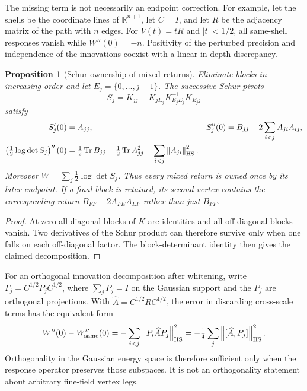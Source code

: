\documentclass[11pt,oneside,openany]{book}
\newtheorem{proposition}[proposition]{Proposition}
\theoremstyle{definition}
\theoremstyle{remark}
\newcommand{\R}{\mathbb R}
\newcommand{\Tr}{\operatorname{Tr}}
\newcommand{\norm}[1]{\left\lVert#1\right\rVert}
\begin{document}
The missing term is not necessarily an endpoint correction. For
example, let the shells be the coordinate lines of $\R^{n+1}$, let
$C=I$, and let $R$ be the adjacency matrix of the path with $n$ edges.
For $V(t)=tR$ and $|t|<1/2$, all same-shell responses vanish while
$W''(0)=-n$. Positivity of the perturbed precision and independence of
the innovations coexist with a linear-in-depth discrepancy.

\begin{proposition}[Schur ownership of mixed returns]
\label{prop:Schur-owned-response}
Eliminate blocks in increasing order and let $E_j=\{0,\ldots,j-1\}$.
The successive Schur pivots
\[
 S_j=K_{jj}-K_{jE_j}K_{E_jE_j}^{-1}K_{E_jj}
\]
satisfy
\begin{align}
 S_j'(0)&=A_{jj},&
 S_j''(0)&=B_{jj}-2\sum_{i<j}A_{ji}A_{ij},\notag\\
 \left(\tfrac12\log\det S_j\right)''(0)
 &=\tfrac12\Tr B_{jj}-\tfrac12\Tr A_{jj}^2
                         -\sum_{i<j}\norm{A_{ji}}_{\mathrm{HS}}^2.
 \label{eq:Schur-owned-response}
\end{align}
Moreover $W=\sum_j\tfrac12\log\det S_j$. Thus every mixed return is
owned once by its later endpoint. If a final block is retained, its
second vertex contains the corresponding return
$B_{FF}-2A_{FE}A_{EF}$ rather than just $B_{FF}$.
\end{proposition}
\begin{proof}
At zero all diagonal blocks of $K$ are identities and all off-diagonal
blocks vanish. Two derivatives of the Schur product can therefore
survive only when one falls on each off-diagonal factor. The
block-determinant identity then gives the claimed decomposition.
\end{proof}

For an orthogonal innovation decomposition after whitening, write
$\Gamma_j=C^{1/2}P_jC^{1/2}$, where $\sum_jP_j=I$ on the Gaussian
support and the $P_j$ are orthogonal projections. With
$\widehat A=C^{1/2}RC^{1/2}$, the error in discarding cross-scale terms
has the equivalent form
\begin{equation}
 W''(0)-W''_{\rm same}(0)
 =-\sum_{i<j}\norm{P_i\widehat A P_j}_{\mathrm{HS}}^2
 =-\tfrac14\sum_j\norm{[\widehat A,P_j]}_{\mathrm{HS}}^2.
 \label{eq:shell-commutator-defect}
\end{equation}
Orthogonality in the Gaussian energy space is therefore sufficient
only when the response operator preserves those subspaces. It is not
an orthogonality statement about arbitrary fine-field vertex legs.
\end{document}
